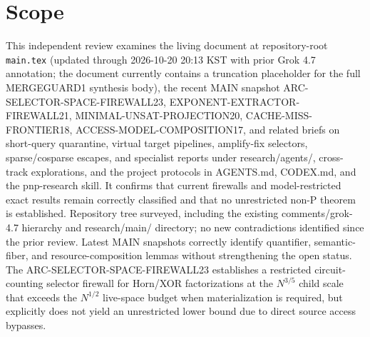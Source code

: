 \documentclass[11pt]{article}
\begin{document}
\section{Scope}
This independent review examines the living document at repository-root \texttt{main.tex} (updated through 2026-10-20 20:13 KST with prior Grok 4.7 annotation; the document currently contains a truncation placeholder for the full MERGEGUARD1 synthesis body), the recent MAIN snapshot ARC-SELECTOR-SPACE-FIREWALL23, EXPONENT-EXTRACTOR-FIREWALL21, MINIMAL-UNSAT-PROJECTION20, CACHE-MISS-FRONTIER18, ACCESS-MODEL-COMPOSITION17, and related briefs on short-query quarantine, virtual target pipelines, amplify-fix selectors, sparse/cosparse escapes, and specialist reports under research/agents/, cross-track explorations, and the project protocols in AGENTS.md, CODEX.md, and the pnp-research skill. It confirms that current firewalls and model-restricted exact results remain correctly classified and that no unrestricted non-P theorem is established. Repository tree surveyed, including the existing comments/grok-4.7 hierarchy and research/main/ directory; no new contradictions identified since the prior review. Latest MAIN snapshots correctly identify quantifier, semantic-fiber, and resource-composition lemmas without strengthening the open status. The ARC-SELECTOR-SPACE-FIREWALL23 establishes a restricted circuit-counting selector firewall for Horn/XOR factorizations at the \(N^{3/5}\) child scale that exceeds the \(N^{1/2}\) live-space budget when materialization is required, but explicitly does not yield an unrestricted lower bound due to direct source access bypasses.
\end{document}
